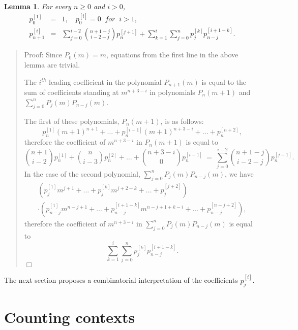 \documentclass{jfp1}
\newenvironment{proof}[1]{\begin{quotation}\noindent\textsf{Proof:} #1}
{\(\Box\)\end{quotation}}
\newtheorem{lemma}[theo]{Lemma}
\newcommand{\p}[2]{p^{[#1]}_{#2}}
\begin{document}
\begin{lemma}\label{p-values}
For every $n \geq 0$ and $i > 0$,
\begin{eqnarray*}
\p{1}{0} &=& 1, \quad \p{i}{0} = 0 \ \textit{~for~} \ i>1,\\
\p{i}{n+1} &= & \sum_{j=0}^{i-2} {n+1-j \choose i-2-j} \p{j+1}{n} + \sum_{k=1}^i \sum_{j=0}^{n} \p{k}{j} \p{i+1-k}{n-j}.
\end{eqnarray*}
\end{lemma}

\begin{proof}
Since $P_0(m)=m$, equations from the first line in the above lemma are trivial.

The $i^{th}$ leading coefficient in the polynomial $P_{n+1}(m)$ is equal to the sum of coefficients standing at $m^{n+3-i}$ in polynomials $P_n(m+1)$ and $\sum_{j=0}^{n} P_j(m) P_{n-j}(m)$.

The first of these polynomials, $P_n(m+1)$, is as follows:
\[\p{1}{n} (m+1)^{n+1} + \ldots + \p{i-1}{n} (m+1)^{n+3-i} + \ldots + \p{n+2}{n},\]
therefore the coefficient of $m^{n+3-i}$ in $P_n(m+1)$ is equal to
  \[{n+1 \choose i-2}\p{1}{n} + {n \choose i-3}\p{2}{n} + \ldots + {n+3-i \choose 0}\p{i-1}{n} \
  = \ \sum_{j=0}^{i-2} {n+1-j \choose i-2-j} \p{j+1}{n}.\]
In the case of the second polynomial, $\sum_{j=0}^{n} P_j(m) P_{n-j}(m)$, we have
\begin{eqnarray*}
\left( \p{1}{j} m^{j+1} + \ldots + \p{k}{j} m^{j+2-k} + \ldots + \p{j+2}{j} \right) \\
\cdot \left( \p{1}{n-j} m^{n-j+1} + \ldots + \p{i+1-k}{n-j} m^{n-j+1+k-i} + \ldots + \p{n-j+2}{n-j} \right),
\end{eqnarray*}
therefore the coefficient of $m^{n+3-i}$ in $\sum_{j=0}^{n} P_j(m) P_{n-j}(m)$ is equal to
\[\sum_{k=1}^i \sum_{j=0}^{n} \p{k}{j} \p{i+1-k}{n-j}. \]
\end{proof}
The next section proposes a combinatorial interpretation of the coefficients $\p{i}{j}$.


\section{Counting contexts}
\label{sec:an-comb-interpr}
\end{document}
